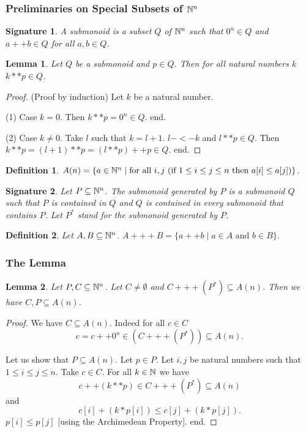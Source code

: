 \documentclass[12pt]{article}
\newtheorem{signature}{Signature}
\newtheorem{definition}{Definition}
\newtheorem{lemma}{Lemma}
\newcommand{\NN}{{\Bbb N}}
\begin{document}
\subsubsection*{Preliminaries on Special Subsets of $\NN^{n}$} 

\begin{signature} A \emph{submonoid} is a subset $Q$ of $\NN^{n}$
such that $0^{n}\in Q$ and $a ++ b \in Q$ for all $a,b \in Q$.
\end{signature}

\begin{lemma} Let $Q$ be a submonoid and $p \in Q$. 
Then for all natural numbers $k$ $k ** p \in Q$.
\end{lemma}
\begin{proof} (Proof by induction)
Let $k$ be a natural number.

(1) Case $k = 0$. Then $k ** p = 0^{n} \in Q$. end.

(2) Case $k \neq 0$. Take $l$ such that $k = l + 1$. $l -<- k$ and
$l ** p \in Q$.
Then $k ** p = (l + 1) ** p = (l ** p) ++ p \in Q$. end.
\end{proof}

\begin{definition} $A(n) = \{a \in \NN^{n} \mid \text{for all } i,j\  
(\text{if } 1 \leq i \leq j \leq n
\text{ then } a[i] \leq a[j])\}$.
\end{definition}

\begin{signature} Let $P \subseteq \NN^{n}$. The 
\emph{submonoid generated by} $P$ is
a submonoid $Q$ such that $P$ is contained in $Q$ and
$Q$ is contained in every submonoid that contains $P$.
Let $P^{*}$ stand for the submonoid generated by $P$.
\end{signature}

\begin{definition} Let $A,B \subseteq \NN^{n}$.
$A +++ B = \{a ++ b \mid a \in A \text{ and } b \in B\}$.
\end{definition}

\subsubsection*{The Lemma}

\begin{lemma} Let $P,C \subseteq \NN^{n}$. Let $C \neq \emptyset$ and 
$C +++ (P^{*}) \subseteq A(n)$.
Then we have $C,P \subseteq A(n)$.
\end{lemma}
\begin{proof}
We have $C \subseteq A(n)$. Indeed for all $c \in C$
          $$c = c ++ 0^{n} \in (C +++ (P^{*})) \subseteq A(n).$$

Let us show that $P \subseteq A(n)$. 
Let $p \in P$.
Let $i,j$ be natural numbers such that $1 \leq i \leq j \leq n$.
Take $c \in C$. For all $k \in \NN$ we have
$$c ++ (k ** p) \in C +++ (P^{*}) \subseteq A(n)$$ 
and 
$$c[i] + (k * p[i]) \leq c[j] + (k * p[j]).$$
$p[i] \leq p[j]$ [using the  Archimedean Property]. end.
\end{proof}
\end{document}
